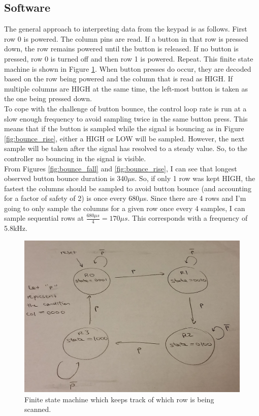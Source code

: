 \documentclass[11pt]{article}
\begin{document}
\subsection{Software}

The general approach to interpreting data from the keypad is as follows. First row 0 is powered. The column pins are read. If a button in that row is pressed down, the row remains powered until the button is released. If no button is pressed, row 0 is turned off and then row 1 is powered. Repeat. This finite state machine is shown in Figure \ref{fig:fsm}. When button presses do occur, they are decoded based on the row being powered and the column that is read as HIGH. If multiple columns are HIGH at the same time, the left-most button is taken as the one being pressed down. \\

To cope with the challenge of button bounce, the control loop rate is run at a slow enough frequency to avoid sampling twice in the same button press. This means that if the button is sampled while the signal is bouncing as in Figure \ref{fig:bounce_rise}, either a HIGH or LOW will be sampled. However, the next sample will be taken after the signal has resolved to a steady value. So, to the controller no bouncing in the signal is visible. \\

From Figures \ref{fig:bounce_fall} and \ref{fig:bounce_rise}, I can see that longest observed button bounce duration is 340$\mu$s. So, if only 1 row was kept HIGH, the fastest the columns should be sampled to avoid button bounce (and accounting for a factor of safety of 2) is once every 680$\mu$s. Since there are 4 rows and I'm going to only sample the columns for a given row once every 4 samples, I can sample sequential rows at $\frac{680\mu s}{4}=170\mu s$. This corresponds with a frequency of 5.8kHz.

\begin{figure}[h!]
\centering
\includegraphics[scale=0.2]{fsm.jpg}
\caption{Finite state machine which keeps track of which row is being scanned.}
\label{fig:fsm}
\end{figure} 
\end{document}
